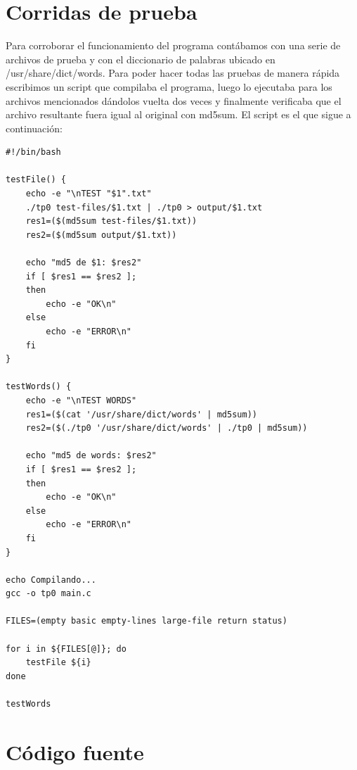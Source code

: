 \documentclass[a4paper,11pt]{article}
\begin{document}
\section{Corridas de prueba}
Para corroborar el funcionamiento del programa cont\'abamos con una serie de archivos de prueba y con el diccionario de palabras ubicado en /usr/share/dict/words. Para poder hacer todas las pruebas de manera r\'apida escribimos un script que compilaba el programa, luego lo ejecutaba para los archivos mencionados d\'andolos vuelta dos veces y finalmente verificaba que el archivo resultante fuera igual al original con md5sum. El script es el que sigue a continuaci\'on:
\lstset{language=bash, breaklines=true, basicstyle=\normalsize}
\begin{lstlisting}
#!/bin/bash

testFile() {
	echo -e "\nTEST "$1".txt"
	./tp0 test-files/$1.txt | ./tp0 > output/$1.txt
	res1=($(md5sum test-files/$1.txt))
	res2=($(md5sum output/$1.txt))
	
	echo "md5 de $1: $res2"
	if [ $res1 == $res2 ]; 
	then
		echo -e "OK\n"
	else
		echo -e "ERROR\n"
	fi
}

testWords() {
	echo -e "\nTEST WORDS"
	res1=($(cat '/usr/share/dict/words' | md5sum))
	res2=($(./tp0 '/usr/share/dict/words' | ./tp0 | md5sum))
	
	echo "md5 de words: $res2"
	if [ $res1 == $res2 ]; 
	then
		echo -e "OK\n"
	else
		echo -e "ERROR\n"
	fi
}

echo Compilando...
gcc -o tp0 main.c

FILES=(empty basic empty-lines large-file return status)

for i in ${FILES[@]}; do
	testFile ${i}
done

testWords
\end{lstlisting}

\section{C\'odigo fuente}
\end{document}
